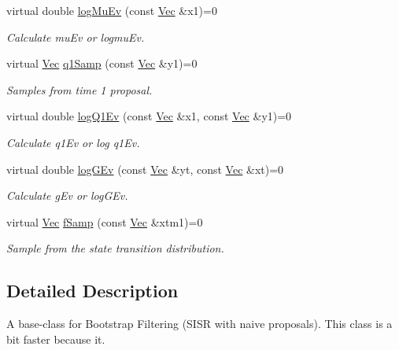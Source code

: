 \begin{DoxyCompactItemize}
virtual double \hyperlink{classBSFilter_a1c1084627bfaf2f3ccf882fc23240b7a}{log\+Mu\+Ev} (const \hyperlink{apf__filter_8h_a4c7df05c6f5e8a0d15ae14bcdbc07152}{Vec} \&x1)=0
\begin{DoxyCompactList}\small\item\em Calculate mu\+Ev or logmu\+Ev. \end{DoxyCompactList}\item 
virtual \hyperlink{apf__filter_8h_a4c7df05c6f5e8a0d15ae14bcdbc07152}{Vec} \hyperlink{classBSFilter_a9792df8f9b13495bc8bdcc53adeae347}{q1\+Samp} (const \hyperlink{apf__filter_8h_a4c7df05c6f5e8a0d15ae14bcdbc07152}{Vec} \&y1)=0
\begin{DoxyCompactList}\small\item\em Samples from time 1 proposal. \end{DoxyCompactList}\item 
virtual double \hyperlink{classBSFilter_a4d2bc2a2530306abaf1a717596b5814d}{log\+Q1\+Ev} (const \hyperlink{apf__filter_8h_a4c7df05c6f5e8a0d15ae14bcdbc07152}{Vec} \&x1, const \hyperlink{apf__filter_8h_a4c7df05c6f5e8a0d15ae14bcdbc07152}{Vec} \&y1)=0
\begin{DoxyCompactList}\small\item\em Calculate q1\+Ev or log q1\+Ev. \end{DoxyCompactList}\item 
virtual double \hyperlink{classBSFilter_aa612efc58f9442a7f6401a5edf0c2799}{log\+G\+Ev} (const \hyperlink{apf__filter_8h_a4c7df05c6f5e8a0d15ae14bcdbc07152}{Vec} \&yt, const \hyperlink{apf__filter_8h_a4c7df05c6f5e8a0d15ae14bcdbc07152}{Vec} \&xt)=0
\begin{DoxyCompactList}\small\item\em Calculate g\+Ev or log\+G\+Ev. \end{DoxyCompactList}\item 
virtual \hyperlink{apf__filter_8h_a4c7df05c6f5e8a0d15ae14bcdbc07152}{Vec} \hyperlink{classBSFilter_ad1cc178c82a518832200949ca4e3d6f6}{f\+Samp} (const \hyperlink{apf__filter_8h_a4c7df05c6f5e8a0d15ae14bcdbc07152}{Vec} \&xtm1)=0
\begin{DoxyCompactList}\small\item\em Sample from the state transition distribution. \end{DoxyCompactList}\end{DoxyCompactItemize}


\subsection{Detailed Description}
A base-\/class for Bootstrap Filtering (S\+I\+SR with naive proposals). This class is a bit faster because it. 

